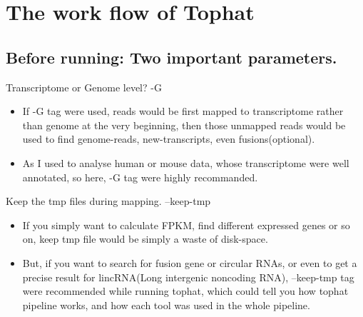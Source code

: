 \section{The work flow of Tophat}

\subsection{ Before running: Two important parameters. }
\begin{frame}[c,fragile]
	\scriptsize{
		\begin{block}{ Transcriptome or Genome level? \alert{ -G } }
			\begin{itemize}
				\item If -G tag were used, reads would be first mapped to transcriptome rather than genome at the very beginning, then those unmapped reads would be used to find genome-reads, new-transcripts, even fusions(optional). \\ \pause
				\item As I used to analyse human or mouse data, whose transcriptome were well annotated, so here, -G tag were highly recommanded. \pause
			\end{itemize}
		\end{block}
		\begin{block}{ Keep the tmp files during mapping. \alert{ --keep-tmp } }
			\begin{itemize}
				\item	If you simply want to calculate FPKM, find different expressed genes or so on, keep tmp file would be simply a waste of disk-space.   \\ \pause
				\item But, if you want to search for \alert{fusion gene} or \alert{circular RNAs}, or even to get a \alert{precise result for lincRNA}(Long intergenic noncoding RNA), --keep-tmp tag were recommended while running tophat, which could tell you how tophat pipeline works, and how each tool was used in the whole pipeline.
			\end{itemize}
		\end{block}
	}
\end{frame}

